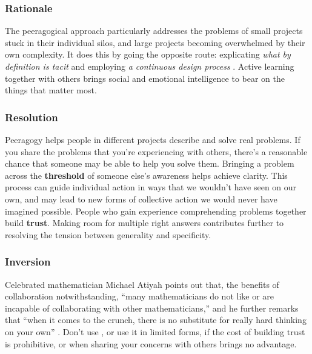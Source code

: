 \subsubsection*{Rationale}
The peeragogical approach particularly addresses the problems of small projects stuck in their individual silos, and large projects becoming overwhelmed by their own complexity.  It does this by going the opposite route: explicating \emph{what by definition is tacit} and employing \emph{a continuous design process} \cite[pp. 9--10]{schummer2014beyond}.   Active learning together with others brings social and emotional intelligence to bear on the things that matter most.

\subsubsection*{Resolution}

Peeragogy helps people in different projects describe and solve real problems. 
If you share the problems that you're experiencing with others, there's a reasonable chance that someone may be able to help you solve them.  Bringing a problem across the \textbf{threshold} of someone else's awareness helps achieve clarity.  
This process can guide individual action in ways that we wouldn't have seen on our own, and may lead to new forms of collective action we would never have imagined possible.  People who gain experience comprehending problems together build \textbf{trust}.
%
Making room for multiple right answers contributes further to resolving the tension between generality and specificity.

\subsubsection*{Inversion}
Celebrated mathematician Michael Atiyah points out that, the benefits
of collaboration notwithstanding, ``many mathematicians do not like or
are incapable of collaborating with other mathematicians,'' and he
further remarks that ``when it comes to the crunch, there is no
substitute for really hard thinking on your own''
\cite{atiyah1974research}.  Don't use , or use
it in limited forms, if the cost of building trust is prohibitive, or
when sharing your concerns with others brings no advantage.

